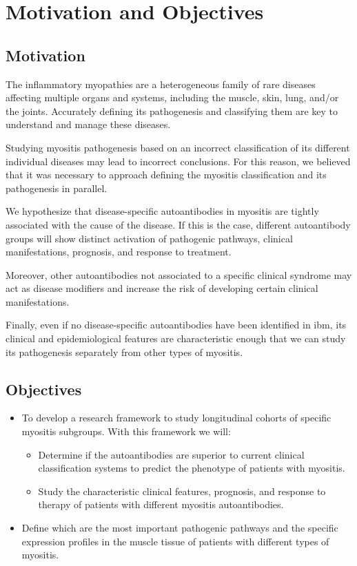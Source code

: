 \chapter{Motivation and Objectives}

\section{Motivation}
The inflammatory myopathies are a heterogeneous family of rare diseases affecting multiple organs and systems, including the muscle, skin, lung, and/or the joints. Accurately defining its pathogenesis and classifying them are key to understand and manage these diseases.

Studying myositis pathogenesis based on an incorrect classification of its different individual diseases may lead to incorrect conclusions. For this reason, we believed that it was necessary to approach defining the myositis classification and its pathogenesis in parallel.

We hypothesize that disease-specific autoantibodies in myositis are tightly associated with the cause of the disease. If this is the case, different autoantibody groups will show distinct activation of pathogenic pathways, clinical manifestations, prognosis, and response to treatment.

Moreover, other autoantibodies not associated to a specific clinical syndrome may act as disease modifiers and increase the risk of developing certain clinical manifestations.

Finally, even if no disease-specific autoantibodies have been identified in \gls{ibm}, its clinical and epidemiological features are characteristic enough that we can study its pathogenesis separately from other types of myositis.

\section{Objectives}
\begin{itemize}
	
	\item To develop a research framework to study longitudinal cohorts of specific myositis subgroups. With this framework we will:
	\begin{itemize}
		\item Determine if the autoantibodies are superior to current clinical classification systems to predict the phenotype of patients with myositis.
		\item Study the characteristic clinical features, prognosis, and response to therapy of patients with different myositis autoantibodies.
	\end{itemize}
	\item Define which are the most important pathogenic pathways and the specific expression profiles in the muscle tissue of patients with different types of myositis.
\end{itemize}

